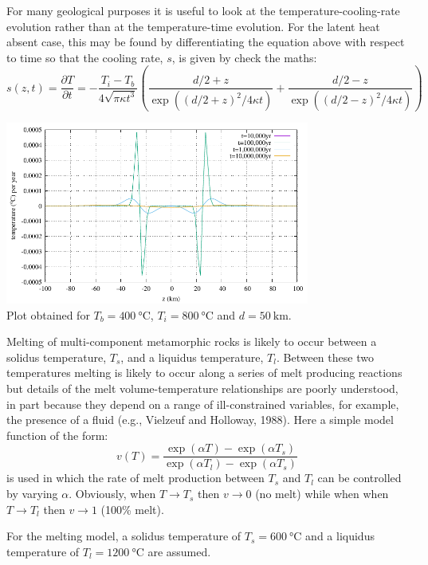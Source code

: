 For many geological purposes it is useful to look at the
temperature-cooling-rate evolution rather than at
the temperature-time evolution. For the latent
heat absent case, this may be found by differentiating the equation above 
with respect to time so that the cooling rate, $s$, is given by {\color{red} check the maths}:
\[
s(z,t) = \frac{\partial T}{\partial t}
=-\frac{T_i-T_b}{4\sqrt{\pi \kappa t^3}}
\left(
\frac{d/2 +z}{\exp((d/2+z)^2/4\kappa t )}
+
\frac{d/2 -z}{\exp((d/2-z)^2/4\kappa t )}
\right)
\]

\begin{center}
\includegraphics[width=10cm]{python_codes/fieldstone_169/images/solution_derv.pdf}\\
{\captionfont Plot obtained for $T_b=400~\si{\celsius}$, $T_i=800~\si{\celsius}$ and $d=50~\si{\km}$.}
\end{center}


Melting of multi-component metamorphic rocks is likely to occur between a solidus
temperature, $T_s$, and a liquidus temperature, $T_l$.
Between these two temperatures melting is likely
to occur along a series of melt producing reactions but details of the melt volume-temperature
relationships are poorly understood, in part because they depend on a range of ill-constrained
variables, for example, the presence of a fluid
(e.g., Vielzeuf and Holloway, 1988). Here a simple model function of the form:
\begin{equation}
v(T) 
= \frac{\exp(\alpha T)- \exp(\alpha T_s) }{\exp(\alpha T_l) - \exp(\alpha T_s) }
\label{eq:stuw95_eq3}
\end{equation}
is used in which the rate of melt production between $T_s$ and $T_l$ can be controlled by varying $\alpha$.
Obviously, when $T\rightarrow T_s$ then $v \rightarrow 0$ (no melt) while when
when $T\rightarrow T_l$ then $v \rightarrow 1$ (100\% melt).


For the melting model, a solidus temperature of $T_s=600~\si{\celsius}$ and a 
liquidus temperature of $T_l = 1200~\si{\celsius}$ are assumed.


